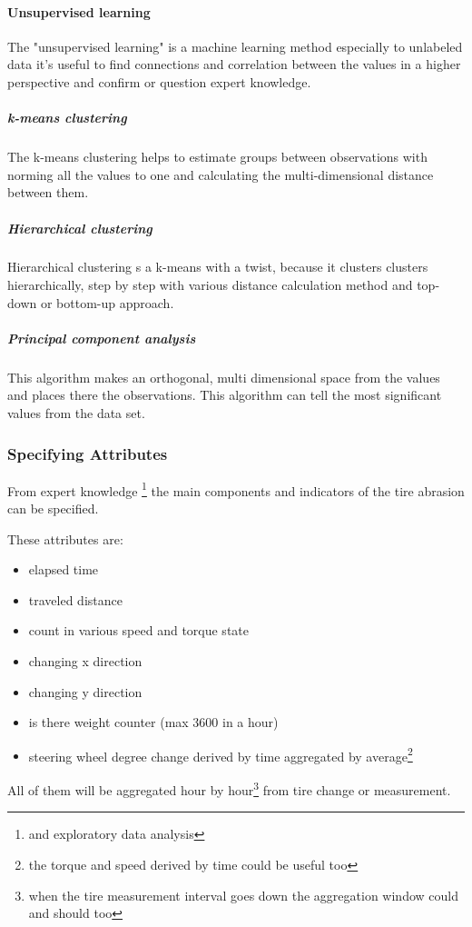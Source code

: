 		\paragraph{Unsupervised learning}\cite{UnsuplearnBook}
		The "unsupervised learning" is a machine learning method especially to unlabeled data it's useful to find connections and correlation between the values in a higher perspective and confirm or question expert knowledge.

		\subparagraph{k-means clustering}
		\cite{k-means}\cite{kmeans2} The k-means clustering helps to estimate groups between observations with norming all the values to one and calculating the multi-dimensional distance between them.
		\subparagraph{Hierarchical clustering}
		\cite{h-clust}\cite{h-clust2}\cite{Clustering} Hierarchical clustering s a k-means with a twist, because it clusters clusters hierarchically, step by step with various distance calculation method and top-down or bottom-up approach.
		\subparagraph{Principal component analysis}
		\cite{PCA}
		This algorithm makes an orthogonal, multi dimensional space from the values and places there the observations. This algorithm can tell the most significant values from the data set.
	\subsubsection{Specifying Attributes}
	From expert knowledge \footnote{and exploratory data analysis} the main components and indicators of the tire abrasion can be specified.

	These attributes are:
	\begin{itemize}
		\item{elapsed time} 
		\item{traveled distance} 
		\item{count in various speed and torque state}
		\item{changing x direction}
		\item{changing y direction}
		\item{is there weight counter (max 3600 in a hour)}
		\item{steering wheel degree change derived by time aggregated by average}\footnote{the torque and speed derived by time could be useful too}
	\end{itemize}
	All of them will be aggregated hour by hour\footnote{when the tire measurement interval goes down the aggregation window could and should too} from tire change or measurement.
